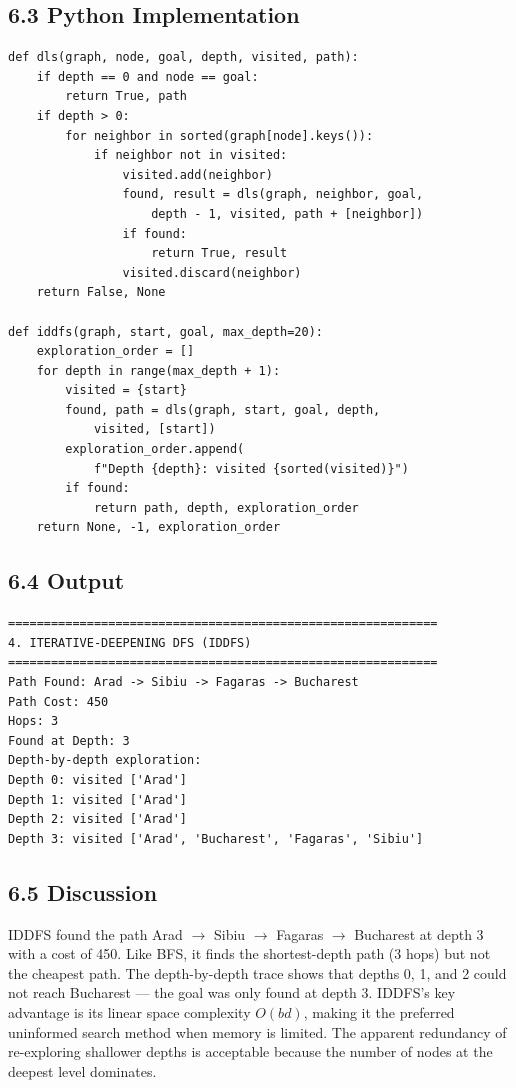 \documentclass[12pt,a4paper]{article}
\begin{document}
\subsection*{6.3 Python Implementation}

\begin{lstlisting}[style=plain, caption={Iterative-Deepening DFS}]
def dls(graph, node, goal, depth, visited, path):
    if depth == 0 and node == goal:
        return True, path
    if depth > 0:
        for neighbor in sorted(graph[node].keys()):
            if neighbor not in visited:
                visited.add(neighbor)
                found, result = dls(graph, neighbor, goal,
                    depth - 1, visited, path + [neighbor])
                if found:
                    return True, result
                visited.discard(neighbor)
    return False, None

def iddfs(graph, start, goal, max_depth=20):
    exploration_order = []
    for depth in range(max_depth + 1):
        visited = {start}
        found, path = dls(graph, start, goal, depth,
            visited, [start])
        exploration_order.append(
            f"Depth {depth}: visited {sorted(visited)}")
        if found:
            return path, depth, exploration_order
    return None, -1, exploration_order
\end{lstlisting}

\subsection*{6.4 Output}

\begin{verbatim}
============================================================
4. ITERATIVE-DEEPENING DFS (IDDFS)
============================================================
Path Found: Arad -> Sibiu -> Fagaras -> Bucharest
Path Cost: 450
Hops: 3
Found at Depth: 3
Depth-by-depth exploration:
Depth 0: visited ['Arad']
Depth 1: visited ['Arad']
Depth 2: visited ['Arad']
Depth 3: visited ['Arad', 'Bucharest', 'Fagaras', 'Sibiu']
\end{verbatim}

\subsection*{6.5 Discussion}

IDDFS found the path Arad $\rightarrow$ Sibiu $\rightarrow$ Fagaras $\rightarrow$ Bucharest at depth 3 with a cost of 450. Like BFS, it finds the shortest-depth path (3 hops) but not the cheapest path. The depth-by-depth trace shows that depths 0, 1, and 2 could not reach Bucharest --- the goal was only found at depth 3. IDDFS's key advantage is its linear space complexity $O(bd)$, making it the preferred uninformed search method when memory is limited. The apparent redundancy of re-exploring shallower depths is acceptable because the number of nodes at the deepest level dominates.
\end{document}
